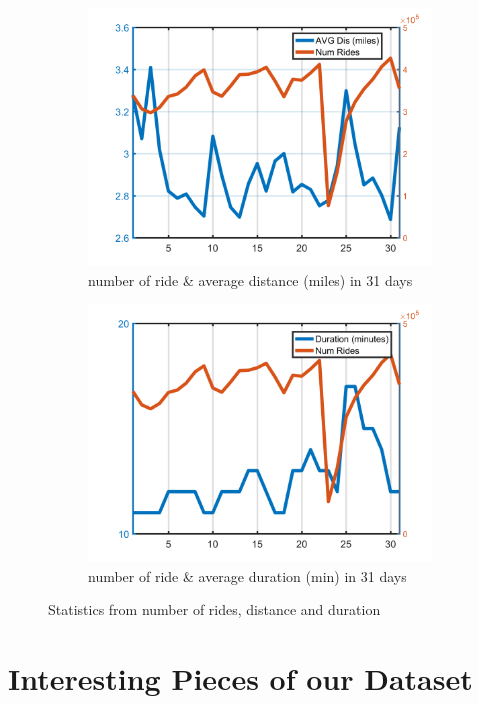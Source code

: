 \documentclass{article}
\begin{document}
\begin{figure}
\begin{subfigure}{.5\linewidth}
  \centering
  \includegraphics[width=.8\linewidth]{numride_dom}
  \caption{number of ride \& average distance (miles) in 31 days}
  \label{fig:sub5}
\end{subfigure}%
\begin{subfigure}{.5\linewidth}
  \centering
  \includegraphics[width=.8\linewidth]{numride_dom_dur}
  \caption{number of ride \& average duration (min) in 31 days}
  \label{fig:sub6}
\end{subfigure}

\caption{Statistics from number of rides, distance and duration}
\label{fig:test}
\end{figure}

\section{Interesting Pieces of our Dataset}
\end{document}
